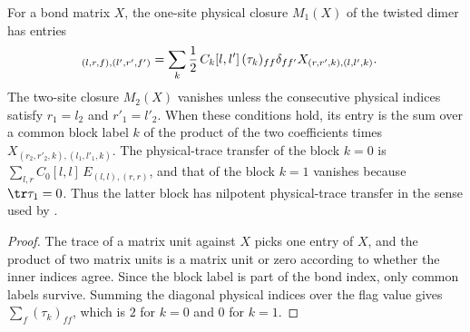 \begin{lemma}%
    \label{thm:mpdo_twisted_dimer_closures}
    \leanok
    For a bond matrix $X$, the one-site physical closure $M_1(X)$ of the
    twisted dimer has entries
    \begin{align}
        [M_1(X)]_{(l,r,f),(l',r',f')}
         & =\sum_k\frac12\,C_k[l,l']\,(\tau_k)_{ff} \delta_{ff'}
        X_{(r,r',k),(l,l',k)}.
        \notag
    \end{align}
    The two-site closure $M_2(X)$ vanishes unless the consecutive physical
    indices satisfy $r_1=l_2$ and $r'_1=l'_2$. When these conditions hold,
    its entry is the sum over a common block label $k$ of the product of the
    two coefficients times $X_{(r_2,r'_2,k),(l_1,l'_1,k)}$.
    The physical-trace transfer of the block $k=0$ is
    $\sum_{l,r}C_0[l,l]\,E_{(l,l),(r,r)}$, and that of the block $k=1$
    vanishes because $\tr\tau_1=0$. Thus the latter block has nilpotent
    physical-trace transfer in the sense used by
    \cite[Definition~4.7, lines~815--822]{Cirac2016MPDO_arXiv}.
\end{lemma}
\begin{proof}\leanok
    The trace of a matrix unit against $X$ picks one entry of $X$, and the
    product of two matrix units is a matrix unit or zero according to whether
    the inner indices agree. Since the block label is part of the bond index,
    only common labels survive. Summing the diagonal physical indices over
    the flag value gives $\sum_f(\tau_k)_{ff}$, which is $2$ for $k=0$
    and $0$ for $k=1$.
\end{proof}

